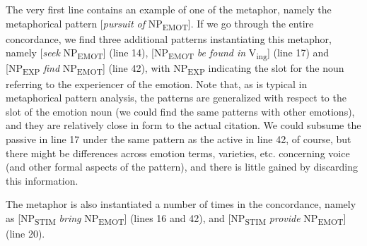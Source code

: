 The very first line contains an example of one of the  meta\-phor,  namely the metaphorical pattern [\textit{pursuit of} NP\textsubscript{EMOT}]. If we go through the entire concordance,  we find three additional patterns instantiating this metaphor, namely [\textit{seek} NP\textsubscript{EMOT}] (line 14), [NP\textsubscript{EMOT} \textit{be found in} V\textsubscript{ing}] (line 17) and [NP\textsubscript{EXP} \textit{find} NP\textsubscript{EMOT}] (line 42), with NP\textsubscript{EXP} indicating the slot for the noun  referring to the experiencer of the emotion.  Note that, as is typical in metaphorical  pattern analysis,  the patterns are generalized with respect to the slot of the emotion noun (we could find the same patterns with other emotions), and they are relatively close in form to the actual citation. We could subsume the passive  in line 17 under the same pattern as the active in line 42, of course, but there might be differences across emotion terms, varieties,  etc. concerning voice (and other formal aspects of the pattern), and there is little gained by discarding this information.

The  metaphor  is also instantiated a number of times in the concordance,  namely as [NP\textsubscript{STIM} \textit{bring} NP\textsubscript{EMOT}] (lines 16 and 42), and [NP\textsubscript{STIM} \textit{provide} NP\textsubscript{EMOT}] (line 20).

